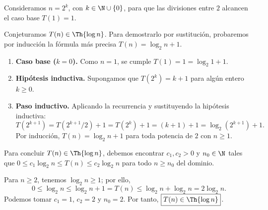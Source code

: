 
Consideramos $n=2^k$, con $k\in\N\cup\{0\}$, para que las divisiones entre $2$ alcancen el caso base $T(1)=1$.

Conjeturamos $T(n)\in\Th{\log n}$. Para demostrarlo por sustitución, probaremos por inducción la fórmula más precisa $T(n)=\log_2 n+1$.

\begin{enumerate}
\item \textbf{Caso base ($k=0$).} Como $n=1$, se cumple $T(1)=1=\log_2 1+1$.

\item \textbf{Hipótesis inductiva.} Supongamos que $T(2^k)=k+1$ para algún entero $k\ge0$.

\item \textbf{Paso inductivo.} Aplicando la recurrencia y sustituyendo la hipótesis inductiva:
\[
T(2^{k+1})=T(2^{k+1}/2)+1
=T(2^k)+1=(k+1)+1
=\log_2(2^{k+1})+1.
\]
Por inducción, $T(n)=\log_2 n+1$ para toda potencia de $2$ con $n\ge1$.
\end{enumerate}

Para concluir $T(n)\in\Th{\log n}$, debemos encontrar $c_1,c_2>0$ y $n_0\in\N$ tales que $0\le c_1\log_2 n\le T(n)\le c_2\log_2 n$ para todo $n\ge n_0$ del dominio.

Para $n\ge2$, tenemos $\log_2 n\ge1$; por ello,
\[
0\le\log_2 n\le\log_2 n+1=T(n)
\le\log_2 n+\log_2 n=2\log_2 n.
\]
Podemos tomar $c_1=1$, $c_2=2$ y $n_0=2$. Por tanto, $\boxed{T(n)\in\Th{\log n}}$.
\fin
